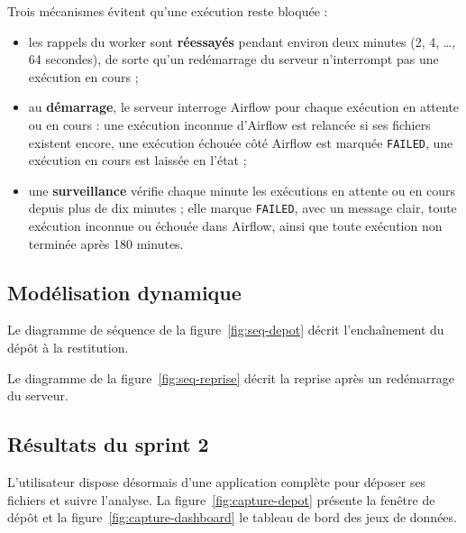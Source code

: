 Trois mécanismes évitent qu'une exécution reste bloquée :
\begin{itemize}
  \item les rappels du worker sont \textbf{réessayés} pendant environ deux minutes (2, 4, \ldots, 64 secondes), de sorte qu'un redémarrage du serveur n'interrompt pas une exécution en cours ;
  \item au \textbf{démarrage}, le serveur interroge Airflow pour chaque exécution en attente ou en cours : une exécution inconnue d'Airflow est relancée si ses fichiers existent encore, une exécution échouée côté Airflow est marquée \texttt{FAILED}, une exécution en cours est laissée en l'état ;
  \item une \textbf{surveillance} vérifie chaque minute les exécutions en attente ou en cours depuis plus de dix minutes ; elle marque \texttt{FAILED}, avec un message clair, toute exécution inconnue ou échouée dans Airflow, ainsi que toute exécution non terminée après 180 minutes.
\end{itemize}

\subsection{Modélisation dynamique}

Le diagramme de séquence de la figure~\ref{fig:seq-depot} décrit l'enchaînement du dépôt à la restitution.


Le diagramme de la figure~\ref{fig:seq-reprise} décrit la reprise après un redémarrage du serveur.


\subsection{Résultats du sprint 2}

L'utilisateur dispose désormais d'une application complète pour déposer ses fichiers et suivre l'analyse. La figure~\ref{fig:capture-depot} présente la fenêtre de dépôt et la figure~\ref{fig:capture-dashboard} le tableau de bord des jeux de données.


